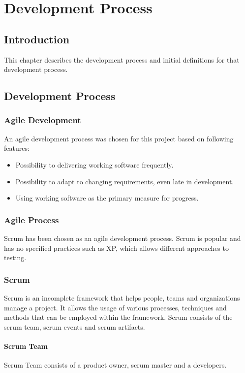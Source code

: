 \chapter{Development Process}

\section{Introduction}
This chapter describes the development process and initial definitions for that development process.

\section{Development Process}
\subsection{Agile Development}
An agile development process was chosen for this project based on following features:
\begin{itemize}
    \item Possibility to delivering working software frequently\cite{principles_agile}.
    \item Possibility to adapt to changing requirements, even late in development\cite{principles_agile}.
    \item Using working software as the primary measure for progress.\cite{principles_agile}
\end{itemize}

\subsection{Agile Process}
Scrum has been chosen as an agile development process. Scrum is popular and has no specified practices 
such as XP, which allows different approaches to testing\cite{example_processes}.

\subsection{Scrum}
Scrum\cite{scrum_guide} is an incomplete framework that helps people, teams and organizations manage a project. 
It allows the usage of various processes, techniques and methods that can be employed within the framework.
Scrum consists of the scrum team, scrum events and scrum artifacts. \newline

\subsubsection{Scrum Team}
Scrum Team consists of a product owner, scrum master and a developers\cite{scrum_guide}.\newline

